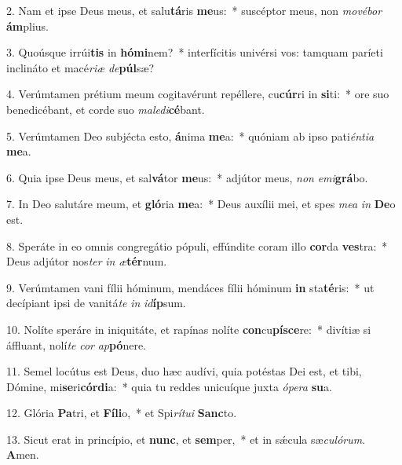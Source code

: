 2. Nam et ipse Deus meus, et salu\textbf{tá}ris \textbf{me}us:~*  suscéptor meus, non \textit{mo}\textit{vé}\textit{bor} \textbf{ám}plius.\

3. Quoúsque irrúi\textbf{tis} in \textbf{hó}\textbf{mi}nem?~*  interfícitis univérsi vos: tamquam paríeti inclináto et macé\textit{ri}\textit{æ} \textit{de}\textbf{púl}sæ?\

4. Verúmtamen prétium meum cogitavérunt repéllere, cu\textbf{cúr}ri in \textbf{si}ti:~*  ore suo benedicébant, et corde suo \textit{ma}\textit{le}\textit{di}\textbf{cé}bant.\

5. Verúmtamen Deo subjécta esto, \textbf{á}nima \textbf{me}a:~*  quóniam ab ipso pati\textit{én}\textit{ti}\textit{a} \textbf{me}a.\

6. Quia ipse Deus meus, et sal\textbf{vá}tor \textbf{me}us:~*  adjútor meus, \textit{non} \textit{e}\textit{mi}\textbf{grá}bo.\

7. In Deo salutáre meum, et \textbf{gló}ria \textbf{me}a:~*  Deus auxílii mei, et spes \textit{me}\textit{a} \textit{in} \textbf{De}o est.\

8. Speráte in eo omnis congregátio pópuli, effúndite coram illo \textbf{cor}da \textbf{ves}tra:~*  Deus adjútor nos\textit{ter} \textit{in} \textit{æ}\textbf{tér}num.\

9. Verúmtamen vani fílii hóminum, mendáces fílii hóminum \textbf{in} sta\textbf{té}ris:~*  ut decípiant ipsi de vanitá\textit{te} \textit{in} \textit{id}\textbf{íp}sum.\

10. Nolíte speráre in iniquitáte, et rapínas nolíte \textbf{con}cu\textbf{pí}\textbf{sce}re:~*  divítiæ si áffluant, nolí\textit{te} \textit{cor} \textit{ap}\textbf{pó}nere.\

11. Semel locútus est Deus, duo hæc audívi, quia potéstas Dei est, et tibi, Dómine, mi\textbf{se}ri\textbf{cór}\textbf{di}a:~*  quia tu reddes unicuíque juxta \textit{ó}\textit{pe}\textit{ra} \textbf{su}a.\

12. Glória \textbf{Pa}tri, et \textbf{Fí}\textbf{li}o,~*  et Spi\textit{rí}\textit{tu}\textit{i} \textbf{Sanc}to.\

13. Sicut erat in princípio, et \textbf{nunc}, et \textbf{sem}per,~*  et in sǽcula sæ\textit{cu}\textit{ló}\textit{rum}. \textbf{A}men.\

